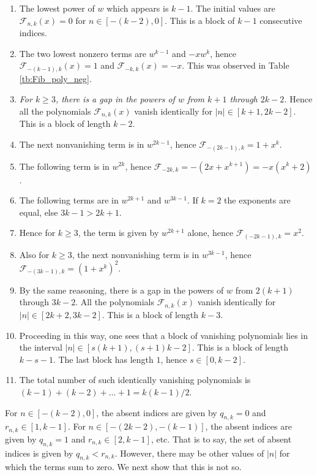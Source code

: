 \documentclass[review]{elsarticle}
\theoremstyle{plain}
\begin{document}
\begin{enumerate}
\item
The lowest power of $w$ which appears is $k-1$.
The initial values are $\mathcal{F}_{n,k}(x)=0$ for $n\in[-(k-2),0]$.
This is a block of $k-1$ consecutive indices.
\item
The two lowest nonzero terms are $w^{k-1}$ and $-xw^k$, hence $\mathcal{F}_{-(k-1),k}(x)=1$ and $\mathcal{F}_{-k,k}(x)=-x$.
This was observed in Table \ref{tb:Fib_poly_neg}.
\item
\emph{For $k\ge3$, there is a gap in the powers of $w$ from $k+1$ through $2k-2$.}
Hence all the polynomials $\mathcal{F}_{n,k}(x)$ vanish identically for $|n|\in[k+1,2k-2]$. This is a block of length $k-2$.
\item
The next nonvanishing term is in $w^{2k-1}$, hence $\mathcal{F}_{-(2k-1),k}=1+x^k$.
\item
The following term is in $w^{2k}$, hence $\mathcal{F}_{-2k,k}=-(2x+x^{k+1})=-x(x^k+2)$.
\item
The following terms are in $w^{2k+1}$ and $w^{3k-1}$. If $k=2$ the exponents are equal, else $3k-1>2k+1$.
\item
Hence for $k\ge3$, the term is given by $w^{2k+1}$ alone, hence $\mathcal{F}_{(-2k-1),k}=x^2$.
\item
Also for $k\ge3$, the next nonvanishing term is in $w^{3k-1}$, hence $\mathcal{F}_{-(3k-1),k}=(1+x^k)^2$.
\item
  By the same reasoning, there is a gap in the powers of $w$ from $2(k+1)$ through $3k-2$.
  All the polynomials $\mathcal{F}_{n,k}(x)$ vanish identically for $|n|\in[2k+2,3k-2]$. This is a block of length $k-3$.
\item
  Proceeding in this way, one sees that a block of vanishing polynomials lies in the interval
  $|n|\in[s(k+1),(s+1)k-2]$. This is a block of length $k-s-1$. 
  The last block has length $1$, hence $s\in[0,k-2]$.
\item
  The total number of such identically vanishing polynomials is $(k-1) +(k-2) +\dots +1 = k(k-1)/2$.
\end{enumerate}
For $n\in[-(k-2),0]$, the absent indices are given by $q_{n,k}=0$ and $r_{n,k}\in[1,k-1]$.
For $n\in[-(2k-2),-(k-1)]$, the absent indices are given by $q_{n,k}=1$ and $r_{n,k}\in[2,k-1]$, etc.
That is to say, the set of absent indices is given by $q_{n,k}<r_{n,k}$.
However, there may be other values of $|n|$ for which the terms sum to zero.
We next show that this is not so.
\end{document}
